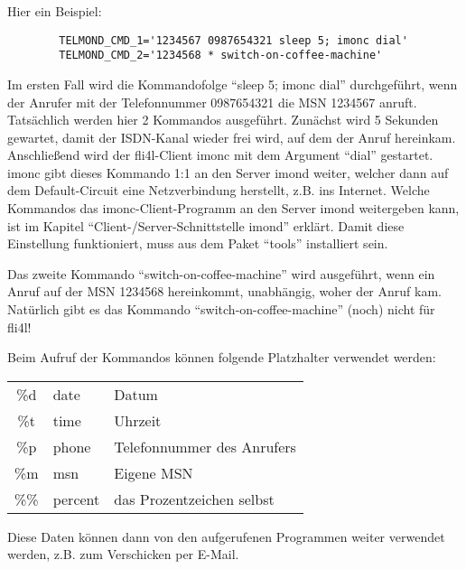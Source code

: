 \begin{description}
  Hier ein Beispiel:

\begin{example}
\begin{verbatim}
        TELMOND_CMD_1='1234567 0987654321 sleep 5; imonc dial'
        TELMOND_CMD_2='1234568 * switch-on-coffee-machine'
\end{verbatim}
\end{example}
  
  Im ersten Fall wird die Kommandofolge ``sleep 5; imonc dial''
  durchgeführt, wenn der Anrufer mit der Telefonnummer 0987654321 die
  MSN 1234567 anruft. Tat\-säch\-lich werden hier 2 Kommandos ausgeführt.
  Zunächst wird 5 Sekunden gewartet, damit der ISDN-Kanal wieder frei
  wird, auf dem der Anruf hereinkam. Anschließend wird der
  fli4l-Client imonc mit dem Argument ``dial'' gestartet. imonc gibt
  dieses Kommando 1:1 an den Server imond weiter, welcher dann auf dem
  Default-Circuit eine Netzverbindung herstellt, z.B. ins Internet.
  Welche Kommandos das imonc-Client-Programm an den Server imond
  weitergeben kann, ist im Kapitel ``Client-/Server-Schnittstelle imond''
  erklärt. Damit diese  Einstellung funktioniert, muss 
  aus dem Paket ``tools'' installiert sein.
  
  Das zweite Kommando ``switch-on-coffee-machine'' wird ausgeführt,
  wenn ein Anruf auf der MSN 1234568 hereinkommt, unabhängig, woher
  der Anruf kam. Na\-tür\-lich gibt es das Kommando
  ``switch-on-coffee-machine'' (noch) nicht für fli4l!
  
  Beim Aufruf der Kommandos können folgende Platzhalter verwendet
  werden:

  \begin{tabular}[h!]{cll}
  \hline
            \%d  &    date   &     Datum \\
            \%t  &    time   &     Uhrzeit \\
            \%p  &    phone  &     Telefonnummer des Anrufers \\
            \%m  &    msn     &    Eigene MSN \\
            \%\%  &    percent &    das Prozentzeichen selbst\\
  \end{tabular}
  
  Diese Daten können dann von den aufgerufenen Programmen weiter
  verwendet werden, z.B. zum Verschicken per \mbox{E-Mail}.



\end{description}
